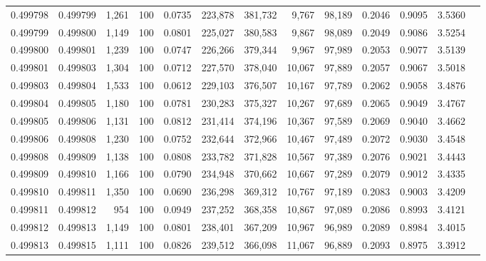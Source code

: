 \begin{tabular}{rrrrrrrrrrrrr}
0.499798 & 0.499799 & 1,261 & 100 &                                     0.0735 & 223,878 & 381,732 &   9,767 &  98,189 & 0.2046 & 0.9095 & 3.5360 \\
0.499799 & 0.499800 & 1,149 & 100 &                                     0.0801 & 225,027 & 380,583 &   9,867 &  98,089 & 0.2049 & 0.9086 & 3.5254 \\
0.499800 & 0.499801 & 1,239 & 100 &                                     0.0747 & 226,266 & 379,344 &   9,967 &  97,989 & 0.2053 & 0.9077 & 3.5139 \\
0.499801 & 0.499803 & 1,304 & 100 &                                     0.0712 & 227,570 & 378,040 &  10,067 &  97,889 & 0.2057 & 0.9067 & 3.5018 \\
0.499803 & 0.499804 & 1,533 & 100 &                                     0.0612 & 229,103 & 376,507 &  10,167 &  97,789 & 0.2062 & 0.9058 & 3.4876 \\
0.499804 & 0.499805 & 1,180 & 100 &                                     0.0781 & 230,283 & 375,327 &  10,267 &  97,689 & 0.2065 & 0.9049 & 3.4767 \\
0.499805 & 0.499806 & 1,131 & 100 &                                     0.0812 & 231,414 & 374,196 &  10,367 &  97,589 & 0.2069 & 0.9040 & 3.4662 \\
0.499806 & 0.499808 & 1,230 & 100 &                                     0.0752 & 232,644 & 372,966 &  10,467 &  97,489 & 0.2072 & 0.9030 & 3.4548 \\
0.499808 & 0.499809 & 1,138 & 100 &                                     0.0808 & 233,782 & 371,828 &  10,567 &  97,389 & 0.2076 & 0.9021 & 3.4443 \\
0.499809 & 0.499810 & 1,166 & 100 &                                     0.0790 & 234,948 & 370,662 &  10,667 &  97,289 & 0.2079 & 0.9012 & 3.4335 \\
0.499810 & 0.499811 & 1,350 & 100 &                                     0.0690 & 236,298 & 369,312 &  10,767 &  97,189 & 0.2083 & 0.9003 & 3.4209 \\
0.499811 & 0.499812 &   954 & 100 &                                     0.0949 & 237,252 & 368,358 &  10,867 &  97,089 & 0.2086 & 0.8993 & 3.4121 \\
0.499812 & 0.499813 & 1,149 & 100 &                                     0.0801 & 238,401 & 367,209 &  10,967 &  96,989 & 0.2089 & 0.8984 & 3.4015 \\
0.499813 & 0.499815 & 1,111 & 100 &                                     0.0826 & 239,512 & 366,098 &  11,067 &  96,889 & 0.2093 & 0.8975 & 3.3912 \\

\end{tabular}
